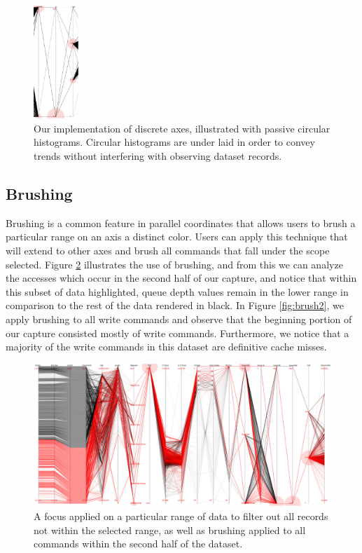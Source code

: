 \documentclass[journal]{vgtc}                %
\begin{document}
\begin{figure}[h!]
 \centering
 \includegraphics[width=0.15\textwidth]{images/discrete.eps}
 \caption[Discrete axes illustrated with circular histograms to convey trends.]{Our implementation of discrete axes, illustrated with passive circular histograms. Circular histograms are under laid in order to convey trends without interfering with observing dataset records.}
 \label{fig:histograms}
\end{figure}

\subsection{Brushing}
Brushing is a common feature in parallel coordinates that allows users to brush a particular range on an axis a distinct color. Users can apply this technique that will extend to other axes and brush all commands that fall under the scope selected. Figure \ref{fig:brush} illustrates the use of brushing, and from this we can analyze the accesses which occur in the second half of our capture, and notice that within this subset of data highlighted, queue depth values remain in the lower range in comparison to the rest of the data rendered in black. In Figure \ref{fig:brush2}, we apply brushing to all write commands and observe that the beginning portion of our capture consisted mostly of write commands. Furthermore, we notice that a majority of the write commands in this dataset are definitive cache misses.

\begin{figure}[h!]
 \centering
 \includegraphics[width=\columnwidth]{images/brush_focus5.eps}
 \caption[Applying brushing to a range of commands in the dataset.]{A focus applied on a particular range of data to filter out all records not within the selected range, as well as brushing applied to all commands within the second half of the dataset.}
 \label{fig:brush}
\end{figure}
\end{document}
